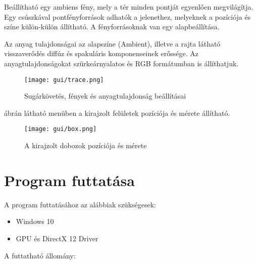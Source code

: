 Beállítható egy ambiens fény, mely a tér minden pontját egyenlően megvilágítja. Egy csúszkával pontfényforrások adhatók a jelenethez, melyeknek a pozíciója és színe külön-külön állítható. A fényforrásoknak van egy alapbeállítása.

Az anyag tulajdonságai az alapszíne (Ambient), illetve a rajta látható visszaverődés diffúz és spakuláris komponenseinek erőssége. Az anyagtulajdonságokat szürkeárnyalatos és RGB formátumban is állíthatjuk.

\begin{figure}[H]
	\centering
	\texttt{[image: gui/trace.png]}
	\caption{Sugárkövetés, fények és anyagtulajdonság beállításai}
	\label{fig:trace-settings}
\end{figure}

 ábrán látható menüben a kirajzolt felületek pozíciója és mérete állítható.

\begin{figure}[H]
	\centering
	\texttt{[image: gui/box.png]}
	\caption{A kirajzolt dobozok pozíciója és mérete}
	\label{fig:box-settings}
\end{figure}

\section{Program futtatása}

A program futtatásához az alábbiak szükségesek: 
\begin{itemize}
	\item Windows 10
	\item GPU és DirectX 12 Driver
\end{itemize}
A futtatható állomány: 


